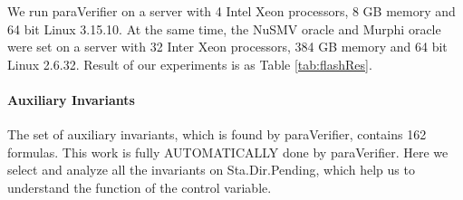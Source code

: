 \documentclass{llncs-new}
\begin{document}
We run {\sf paraVerifier} on a server with 4 Intel Xeon processors, 8 GB memory and 64 bit Linux 3.15.10. At the same time, the NuSMV oracle and Murphi oracle were set on a server with 32 Inter Xeon processors, 384 GB memory and 64 bit Linux 2.6.32. Result of our experiments is as Table \ref{tab:flashRes}.










\vspace{-15pt}

\paragraph{Auxiliary Invariants }
The set of auxiliary invariants, which is found by {\sf paraVerifier}, contains 162 formulas. This work is  fully AUTOMATICALLY  done by {\sf paraVerifier}.  Here we select and analyze all the invariants on Sta.Dir.Pending, which help us to understand the function of the control variable.
\end{document}
